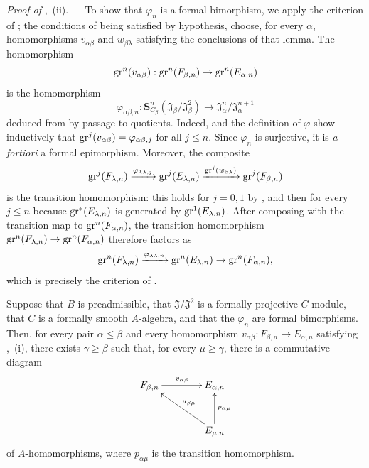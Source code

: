 \begin{env}[19.5.6.6]
\label{0.19.5.6.6}
\emph{Proof of} ,~(ii). ---
To show that $\varphi_n$ is a formal bimorphism, we apply the criterion of ; the conditions of  being satisfied by hypothesis, choose, for every $\alpha$, homomorphisms $v_{\alpha\beta}$ and $w_{\beta\lambda}$ satisfying the conclusions of that lemma.
The homomorphism
\[
  \operatorname{gr}^n(v_{\alpha\beta}):\operatorname{gr}^n(F_{\beta,n})\to\operatorname{gr}^n(E_{\alpha,n})
\]
is the homomorphism
\[
  \varphi_{\alpha\beta,n}:\mathbf{S}_{C_\beta}^n(\mathfrak{J}_\beta/\mathfrak{J}_\beta^2)\to\mathfrak{J}_\alpha^n/\mathfrak{J}_\alpha^{n+1}
\]
deduced from  by passage to quotients.
Indeed,  and the definition of $\varphi$ show inductively that $\operatorname{gr}^j(v_{\alpha\beta})=\varphi_{\alpha\beta,j}$ for all $j\leq n$.
Since $\varphi_n$ is surjective, it is \emph{a fortiori} a formal epimorphism.
Moreover, the composite
\[
  \operatorname{gr}^j(F_{\lambda,n})\xrightarrow{\varphi_{\lambda\lambda,j}}\operatorname{gr}^j(E_{\lambda,n})\xrightarrow{\operatorname{gr}^j(w_{\beta\lambda})}\operatorname{gr}^j(F_{\beta,n})
\]
is the transition homomorphism: this holds for $j=0,1$ by , and then for every $j\leq n$ because $\operatorname{gr}^*(E_{\lambda,n})$ is generated by $\operatorname{gr}^1(E_{\lambda,n})$.
After composing with the transition map to $\operatorname{gr}^n(F_{\alpha,n})$, the transition homomorphism $\operatorname{gr}^n(F_{\lambda,n})\to\operatorname{gr}^n(F_{\alpha,n})$ therefore factors as
\[
  \operatorname{gr}^n(F_{\lambda,n})\xrightarrow{\varphi_{\lambda\lambda,n}}\operatorname{gr}^n(E_{\lambda,n})\to\operatorname{gr}^n(F_{\alpha,n}),
\]
which is precisely the criterion of .
\end{env}

\begin{lemma}[19.5.6.7]
\label{0.19.5.6.7}
Suppose that $B$ is preadmissible, that $\mathfrak{J}/\mathfrak{J}^2$ is a formally projective $C$-module, that $C$ is a formally smooth $A$-algebra, and that the $\varphi_n$ are formal bimorphisms.
Then, for every pair $\alpha\leq\beta$ and every homomorphism $v_{\alpha\beta}:F_{\beta,n}\to E_{\alpha,n}$ satisfying ,~{\rm(i)}, there exists $\gamma\geq\beta$ such that, for every $\mu\geq\gamma$, there is a commutative diagram
\[
\xymatrix@C=4em@R=3em{
  F_{\beta,n} \ar[r]^{v_{\alpha\beta}} & E_{\alpha,n} \\
  & E_{\mu,n} \ar[ul]_{u_{\beta\mu}} \ar[u]_{p_{\alpha\mu}}
}
\]
of $A$-homomorphisms, where $p_{\alpha\mu}$ is the transition homomorphism.
\end{lemma}

